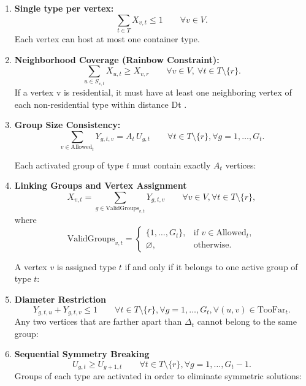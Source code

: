 \documentclass[12pt,a4paper]{article}
\begin{document}
\begin{enumerate}
    \item \textbf{Single type per vertex:}
    \[
    \sum_{t\in T} X_{v,t} \le 1 \qquad \forall v\in V.
    \]
    Each vertex can host at most one container type.
    \item \textbf{Neighborhood Coverage (Rainbow Constraint):}
    \[
    \sum_{u\in S_{v,t}} X_{u,t} \ge X_{v,r}
    \qquad \forall v\in V,\ \forall t\in T\setminus\{r\}.
    \]
    If a vertex v is residential, it must have at least one neighboring vertex of each
non-residential type within distance Dt
.
    \item \textbf{Group Size Consistency:}
    \[
    \sum_{v \in \text{Allowed}_t} Y_{g,t,v} = A_t \, U_{g,t} 
    \qquad \forall t \in T \setminus \{r\}, \forall g = 1,\dots,G_t.
    \]

    Each activated group of type $t$ must contain exactly $A_t$ vertices:

    \item\textbf{Linking Groups and Vertex Assignment}
    \[
    X_{v,t} = \sum_{g \in \text{ValidGroups}_{v,t}} Y_{g,t,v} 
    \qquad \forall v \in V, \forall t \in T \setminus \{r\},
    \]
    where 
    \[
    \text{ValidGroups}_{v,t} =
    \begin{cases}
    \{1,\dots,G_t\}, & \text{if } v \in \text{Allowed}_t,\\[3pt]
    \varnothing, & \text{otherwise.}
    \end{cases}
    \]

    A vertex $v$ is assigned type $t$ if and only if it belongs to one active group of type $t$:

    \item\textbf{Diameter Restriction}
    \[
    Y_{g,t,u} + Y_{g,t,v} \le 1
    \qquad 
    \forall t \in T \setminus \{r\}, \forall g = 1,\dots,G_t, 
    \forall (u,v) \in \text{TooFar}_t.
    \]
    Any two vertices that are farther apart than $\Delta_t$ cannot belong to the same group:
    \item\textbf{ Sequential Symmetry Breaking}
    \[
    U_{g,t} \ge U_{g+1,t} 
    \qquad \forall t \in T \setminus \{r\}, \forall g = 1,\dots,G_t - 1.
    \]
    Groups of each type are activated in order to eliminate symmetric solutions:
\end{enumerate}
\end{document}
